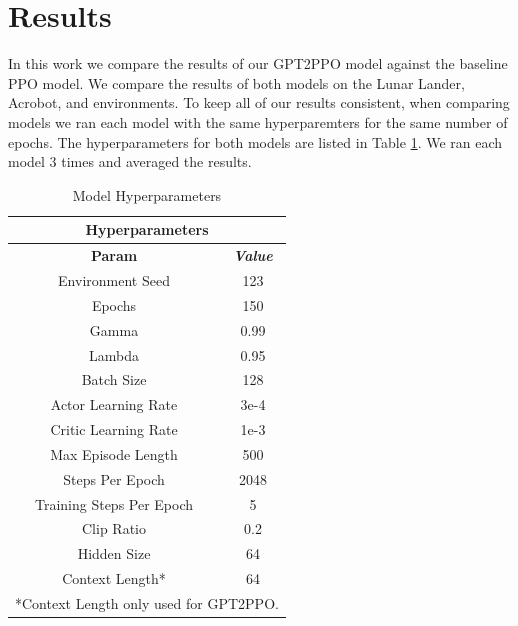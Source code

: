 


\section{Results}
\label{sec:results}

In this work we compare the results of our GPT2PPO model against the baseline PPO model. 
We compare the results of both models on the Lunar Lander, Acrobot, and environments.
To keep all of our results consistent, when comparing models we ran each model with the
same hyperparemters for the same number of epochs.
The hyperparameters for both models are listed in Table \ref{tab:hyperparameters}.
We ran each model 3 times and averaged the results. 

\begin{table}[htbp]
    \caption{Model Hyperparameters}
    \begin{center}
    \begin{tabular}{|c|c|}
    \hline
        \multicolumn{2}{|c|}{\textbf{Hyperparameters}} \\
    \hline
    \textbf{Param} & \textbf{\textit{Value}} \\
    \hline
        Environment Seed & 123 \\
        Epochs & 150 \\
        Gamma & 0.99 \\
        Lambda & 0.95 \\
        Batch Size & 128 \\
        Actor Learning Rate & 3e-4 \\
        Critic Learning Rate & 1e-3 \\
        Max Episode Length & 500 \\
        Steps Per Epoch & 2048 \\
        Training Steps Per Epoch & 5 \\
        Clip Ratio & 0.2 \\
        Hidden Size & 64 \\
        Context Length* & 64 \\
    \hline
    \multicolumn{2}{l}{*Context Length only used for GPT2PPO.}
    \end{tabular}
    \label{tab:hyperparameters}
    \end{center}
\end{table}

